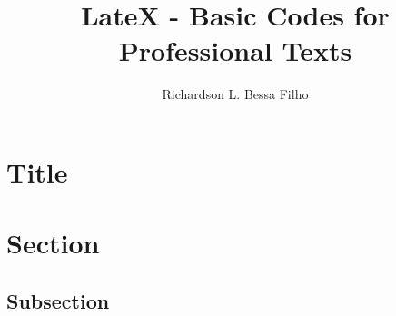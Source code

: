 \documentclass[12pt,a4paper]{article}
\title{LateX - Basic Codes for Professional Texts}
\author{Richardson L. Bessa Filho
}
\date{ }
\begin{document}
\maketitle

\section*{Title}

\section{Section}
\subsection{Subsection}
\end{document}
